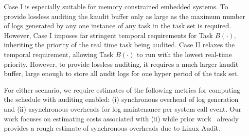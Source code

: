 Case I is especially suitable for memory constrained embedded systems. To provide lossless auditing the kaudit buffer only as large as the maximum number of logs generated by any one instance of any task in the task set is required.
However, Case I imposes far stringent temporal requirements for Task $B(\cdot)$, inheriting the priority of the real time task being audited.
Case II relaxes the temporal requirement, allowing Task $B(\cdot)$ to run with the lowest real-time priority. However, to provide lossless auditing, it requires a much larger kaudit buffer, large enough to store all audit logs for one hyper period of the task set.

For either scenario, we require estimates of the following metrics for computing the schedule with auditing enabled: (i) synchronous overhead of log generation and (ii) asynchronous overheads for log maintenance per system call event. Our work focuses on estimating costs associated with (ii) while prior work~\cite{Ma2018} already provides a rough estimate of synchronous overheads due to Linux Audit.